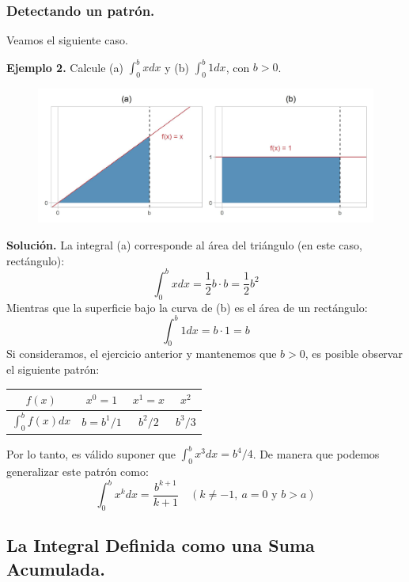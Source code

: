 \documentclass[12pt]{article}
\begin{document}
\subsubsection{Detectando un patrón.}

Veamos el siguiente caso.

\textbf{Ejemplo 2.} \quad Calcule (a) $\int_{0}^{b} x dx$ y (b) $\int_{0}^{b} 1 dx$, con $b > 0$.

\newpage

\begin{figure}[hbt!]
\centering
\includegraphics[scale = 0.7]{img/riemann_example-2.jpg}
\end{figure}

\textbf{Solución.} \quad La integral (a) corresponde al área del triángulo (en este caso, rectángulo):
\[
  \int_{0}^{b} x dx = \frac{1}{2} b \cdot b = \frac{1}{2} b^{2}
\]
Mientras que la superficie bajo la curva de (b) es el área de un rectángulo:
\[
  \int_{0}^{b} 1 dx = b \cdot 1 = b
\]
Si consideramos, el ejercicio anterior y mantenemos que $b > 0$, es posible observar el siguiente patrón:

\begin{table}[hbt!]
\centering

\begin{tabular}{c|c c c}
$f(x)$ & $x^{0} = 1$ & $x^{1} = x$ & $x^{2}$ \\
\hline
$\int_{0}^{b} f(x) dx$ & $b = b^{1}/1$ & $b^{2}/2$ & $b^{3}/3$
\end{tabular}

\end{table}

Por lo tanto, es válido suponer que $\int_{0}^{b} x^{3}dx = b^{4}/4$. De manera que podemos generalizar este patrón como:
\[
  \int_{0}^{b} x^{k} dx = \frac{b^{k + 1}}{k + 1} \quad (k \neq -1, \ a = 0 \text{ y } b > a)
\]


\subsection{La Integral Definida como una Suma Acumulada.}
\end{document}
